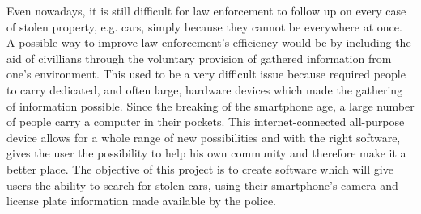 \samenvatting

Even nowadays, it is still difficult for law enforcement to follow up on every case of stolen property, e.g. cars, simply because they cannot be everywhere at once. A possible way to improve law enforcement's efficiency would be by including the aid of civillians through the voluntary provision of gathered information from one's environment. This used to be a very difficult issue because required people to carry dedicated, and often large, hardware devices which made the gathering of information possible. Since the breaking of the smartphone age, a large number of people carry a computer in their pockets. This internet-connected all-purpose device allows for a whole range of new possibilities and with the right software, gives the user the possibility to help his own community and therefore make it a better place. The objective of this project is to create software which will give users the ability to search for stolen cars, using their smartphone's camera and license plate information made available by the police.

